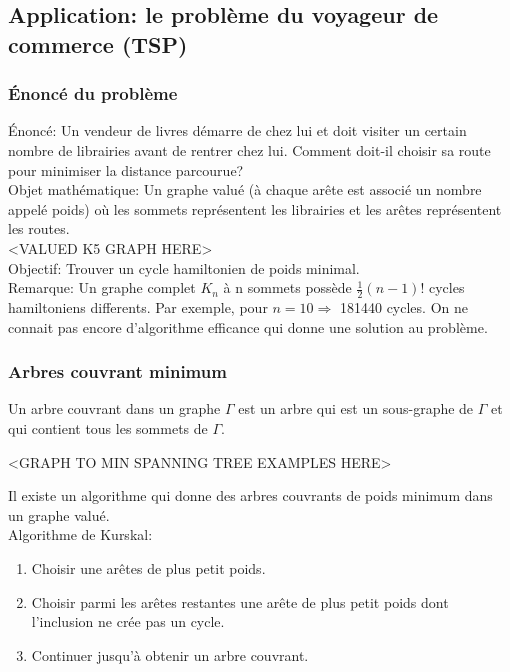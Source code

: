 \subsection{Application: le problème du voyageur de commerce (TSP)}

\subsubsection{Énoncé du problème}

Énoncé: Un vendeur de livres démarre de chez lui et doit visiter un certain nombre de librairies avant de rentrer chez lui. Comment doit-il choisir sa route pour minimiser la distance parcourue? \\ 

Objet mathématique: Un graphe valué (à chaque arête est associé un nombre appelé poids) où les sommets représentent les librairies et les arêtes représentent les routes.\\

<VALUED K5 GRAPH HERE>\\

Objectif: Trouver un cycle hamiltonien de poids minimal.\\

Remarque: Un graphe complet $K_{n}$ à n sommets possède $\frac{1}{2}(n-1)!$ cycles hamiltoniens differents. Par exemple, pour $n=10 \Rightarrow$ 181440 cycles. On ne connait pas encore d'algorithme efficance qui donne une solution au problème.\\

\subsubsection{Arbres couvrant minimum}

\begin{defn}
Un arbre couvrant dans un graphe $\Gamma$ est un arbre qui est un sous-graphe de $\Gamma$ et qui contient tous les sommets de $\Gamma$.\\
\end{defn}

\begin{exmp}
<GRAPH TO MIN SPANNING TREE EXAMPLES HERE>\\
\end{exmp}

Il existe un algorithme qui donne des arbres couvrants de poids minimum dans un graphe valué.\\

Algorithme de Kurskal:
\begin{enumerate}[i]
\item Choisir une arêtes de plus petit poids.
\item Choisir parmi les arêtes restantes une arête de plus petit poids dont l'inclusion ne crée pas un cycle.
\item Continuer jusqu'à obtenir un arbre couvrant.\\
\end{enumerate}


